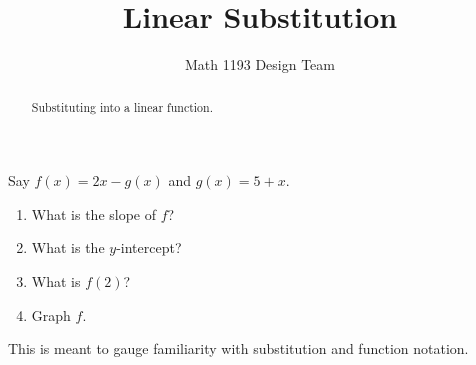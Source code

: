\documentclass[noauthor]{ximera}
\title{Linear Substitution}
\author{Math 1193 Design Team}
\begin{document}
\begin{abstract}
    Substituting into a linear function.
\end{abstract}
\maketitle

Say \(f(x) = 2x - g(x)\) and \(g(x) = 5 + x\).

\begin{enumerate}
    \item What is the slope of \(f\)?
    \item What is the \(y\)-intercept?
    \item What is \(f(2)\)?
    \item Graph \(f\).
\end{enumerate}

\begin{instructorNotes}
This is meant to gauge familiarity with substitution and function notation.
\end{instructorNotes}
\end{document}
